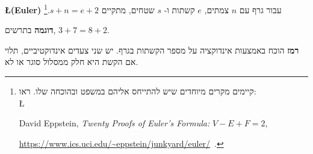 \begin{center}
\end{center}

\begin{exercise} \textbf{\L{(Euler)}}
עבור גרף עם
$n$
צמתים,
$e$
קשתות ו-%
$s$
שטחים, מתקיים 
$s+n=e+2$.\footnote{%
קיימים מקרים מיוחדים שיש להתייחס אליהם במשפט ובהוכחה שלו. ראו:\\
\L{
David Eppstein, \textit{Twenty Proofs of Euler's Formula:} $V-E+F=2$,

\url{https://www.ics.uci.edu/~eppstein/junkyard/euler/}\ .}}
\end{exercise}
\textbf{דוגמה}
בתרשים, 
$3+7=8+2$.

\textbf{רמז}
הוכח באמצעות אינדוקציה על מספר הקשתות בגרף. יש שני צעדים אינדוקטיביים, תלוי אם הקשת היא חלק ממסלול סוגר או לא.

